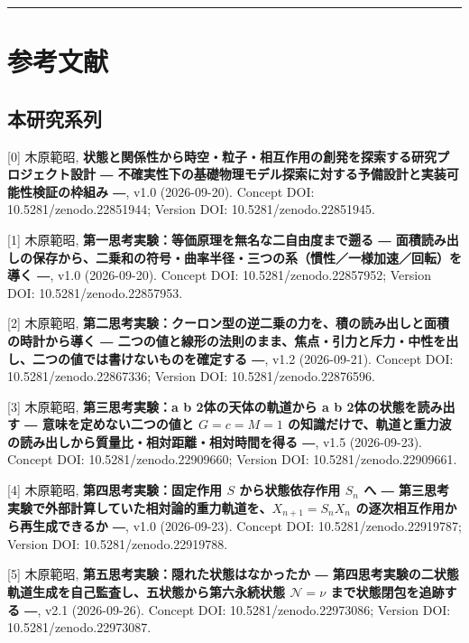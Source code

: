 \documentclass[
  a4paper,
]{ltjsarticle}
\begin{document}
\begin{center}\rule{0.5\linewidth}{0.5pt}\end{center}

\section{参考文献}\label{ux53c2ux8003ux6587ux732e}

\subsection{本研究系列}\label{ux672cux7814ux7a76ux7cfbux5217}

{[}0{]} 木原範昭,
\textbf{状態と関係性から時空・粒子・相互作用の創発を探索する研究プロジェクト設計
― 不確実性下の基礎物理モデル探索に対する予備設計と実装可能性検証の枠組み
―}, v1.0 (2026-09-20). Concept DOI: 10.5281/zenodo.22851944; Version
DOI: 10.5281/zenodo.22851945.

{[}1{]} 木原範昭, \textbf{第一思考実験：等価原理を無名な二自由度まで遡る
―
面積読み出しの保存から、二乗和の符号・曲率半径・三つの系（慣性／一様加速／回転）を導く
―}, v1.0 (2026-09-20). Concept DOI: 10.5281/zenodo.22857952; Version
DOI: 10.5281/zenodo.22857953.

{[}2{]} 木原範昭,
\textbf{第二思考実験：クーロン型の逆二乗の力を、積の読み出しと面積の時計から導く
―
二つの値と線形の法則のまま、焦点・引力と斥力・中性を出し、二つの値では書けないものを確定する
―}, v1.2 (2026-09-21). Concept DOI: 10.5281/zenodo.22867336; Version
DOI: 10.5281/zenodo.22876596.

{[}3{]} 木原範昭, \textbf{第三思考実験：a b 2体の天体の軌道から a b
2体の状態を読み出す ― 意味を定めない二つの値と \(G=c=M=1\)
の知識だけで、軌道と重力波の読み出しから質量比・相対距離・相対時間を得る
―}, v1.5 (2026-09-23). Concept DOI: 10.5281/zenodo.22909660; Version
DOI: 10.5281/zenodo.22909661.

{[}4{]} 木原範昭, \textbf{第四思考実験：固定作用 \(S\) から状態依存作用
\(S_n\) へ ―
第三思考実験で外部計算していた相対論的重力軌道を、\(X_{n+1}=S_nX_n\)
の逐次相互作用から再生成できるか ―}, v1.0 (2026-09-23). Concept DOI:
10.5281/zenodo.22919787; Version DOI: 10.5281/zenodo.22919788.

{[}5{]} 木原範昭, \textbf{第五思考実験：隠れた状態はなかったか ―
第四思考実験の二状態軌道生成を自己監査し、五状態から第六永続状態
\(\mathcal N=\nu\) まで状態閉包を追跡する ―}, v2.1 (2026-09-26). Concept
DOI: 10.5281/zenodo.22973086; Version DOI: 10.5281/zenodo.22973087.
\end{document}
